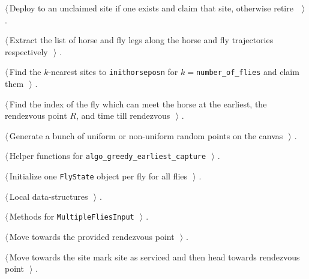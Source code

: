 \documentclass[11.5pt]{report}
\begin{document}
{\begin{list}{}{\setlength{\itemsep}{-\parsep}\setlength{\itemindent}{-\leftmargin}}
\item $\langle\,$Deploy  to an unclaimed site if one exists and claim that site, otherwise retire \nobreak\ {\footnotesize {}}$\,\rangle$ {\footnotesize {\NWtxtRefIn} .}
\item $\langle\,$Extract the list of horse and fly legs along the horse and fly trajectories respectively\nobreak\ {\footnotesize {}}$\,\rangle$ {\footnotesize {\NWtxtRefIn} .}
\item $\langle\,$Find the $k$-nearest sites to \verb|inithorseposn| for $k=$\verb|number_of_flies| and claim them\nobreak\ {\footnotesize {}}$\,\rangle$ {\footnotesize {\NWtxtRefIn} .}
\item $\langle\,$Find the index of the fly  which can meet the horse at the earliest, the rendezvous point $R$, and time till rendezvous\nobreak\ {\footnotesize {}}$\,\rangle$ {\footnotesize {\NWtxtRefIn} .}
\item $\langle\,$Generate a bunch of uniform or non-uniform random points on the canvas\nobreak\ {\footnotesize {}}$\,\rangle$ {\footnotesize {\NWtxtRefIn} .}
\item $\langle\,$Helper functions for \verb|algo_greedy_earliest_capture|\nobreak\ {\footnotesize {}}$\,\rangle$ {\footnotesize {\NWtxtRefIn} .}
\item $\langle\,$Initialize one \verb|FlyState| object per fly for all flies\nobreak\ {\footnotesize {}}$\,\rangle$ {\footnotesize {\NWtxtRefIn} .}
\item $\langle\,$Local data-structures\nobreak\ {\footnotesize {}}$\,\rangle$ {\footnotesize {\NWtxtRefIn} .}
\item $\langle\,$Methods for \verb|MultipleFliesInput|\nobreak\ {\footnotesize {}}$\,\rangle$ {\footnotesize {\NWtxtRefIn} .}
\item $\langle\,$Move towards the provided rendezvous point\nobreak\ {\footnotesize {}}$\,\rangle$ {\footnotesize {\NWtxtRefIn} .}
\item $\langle\,$Move towards the site mark site as serviced and then head towards rendezvous point\nobreak\ {\footnotesize {}}$\,\rangle$ {\footnotesize {\NWtxtRefIn} .}

\end{list}}
\end{document}

